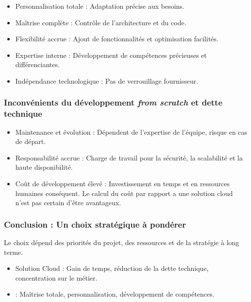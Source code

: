\begin{itemize}
\item {\bt Personnalisation totale :} Adaptation précise aux besoins.
\item {\bt Maîtrise complète :} Contrôle de l'architecture et du code.
\item {\bt Flexibilité accrue :} Ajout de fonctionnalités et optimisation facilités.
\item {\bt Expertise interne :} Développement de compétences précieuses et différenciantes.
\item {\bt Indépendance technologique :} Pas de verrouillage fournisseur.
\end{itemize}

\subsubsection{Inconvénients du développement {\it from scratch} et dette technique}

\begin{itemize}
\item {\bt Maintenance et évolution :} Dépendent de l'expertise de l'équipe,
risque en cas de départ.
\item {\bt Responsabilité accrue :} Charge de travail pour la sécurité, la
scalabilité et la haute disponibilité.
\item {\bt Coût de développement élevé :} Investissement en temps et en
ressources humaines conséquent. Le calcul du coût par rapport a une solution
cloud n'est pas certain d'être avantageux.
\end{itemize}

\subsubsection{Conclusion : Un choix stratégique à pondérer}

Le choix dépend des priorités du projet, des ressources et de la stratégie à
long terme.

\begin{itemize}
\item {\bt Solution Cloud :} Gain de temps, réduction de la dette technique,
concentration sur le métier.
\item { :} Maîtrise totale, personnalisation,
développement de compétences.
\end{itemize}
